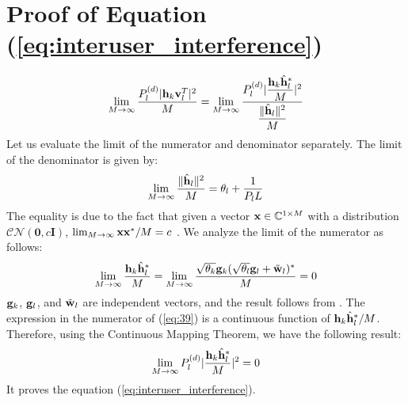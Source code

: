 \documentclass[draftclsnofoot, 12pt, onecolumn, journal]{IEEEtran}
\newcommand{\gv}{{\bf g}}
\newcommand{\hv}{{\bf h}}
\newcommand{\wv}{{\bf w}}
\newcommand{\vv}{{\bf v}}
\newcommand{\xv}{{\bf x}}
\begin{document}
\appendices

\section{Proof of Equation (\ref{eq:interuser_interference})}
\label{App:proof_interuser_interference}
%
\begin{align}
\lim_{M \rightarrow \infty} \frac{ P_l^{(d)} \vert \hv_k \vv_l^T \vert^2} {M} 
= \lim_{M \rightarrow \infty} \frac{ P_l^{(d)} \vert \dfrac{ \hv_k \hat{\hv}_l^* }{M} \vert^2} { \dfrac{\Vert \hat{\hv}_l \Vert^2}{M}}
\label{eq:39}
\end{align}
%
Let us evaluate the limit of the numerator and denominator separately.
The limit of the denominator is given by: 
%
\begin{align}
\lim_{M \rightarrow \infty} \dfrac{\Vert \hat{\hv}_l \Vert^2}{M} = \theta_l + \frac{1}{P_l L}
\end{align}
%
The equality is due to the fact that given a vector $\xv \in \mathbb{C}^{1 \times M}$ with a distribution $\mathcal{CN}(\textbf{0}, c \textbf{I})$, $\lim_{M \rightarrow \infty} \xv \xv^* / M = c$ \cite[Lemma~1]{ fernandes2013inter}. 
We analyze the limit of the numerator as follows:
%
\begin{align}
\lim_{M \rightarrow \infty} \dfrac{ \hv_k \hat{\hv}_l^* }{M} = \lim_{M \rightarrow \infty} \dfrac{ \sqrt{\theta_k} \gv_k ( \sqrt{\theta_l} \gv_l + \tilde{\wv}_l )^* }{M} = 0
\end{align}
%
$\gv_k$, $\gv_l$, and $\tilde{\wv}_l$ are independent vectors, and the result follows from \cite[Lemma~1]{ fernandes2013inter}.
The expression in the numerator of (\ref{eq:39}) is a continuous function of $ \hv_k \hat{\hv}_l^* / M$.
Therefore, using the Continuous Mapping Theorem, we have the following result:
\begin{align}
\lim_{M \rightarrow \infty} P_l^{(d)} \vert \dfrac{ \hv_k \hat{\hv}_l^* }{M} \vert^2 = 0
\end{align}
%
It proves the equation (\ref{eq:interuser_interference}).
\end{document}
